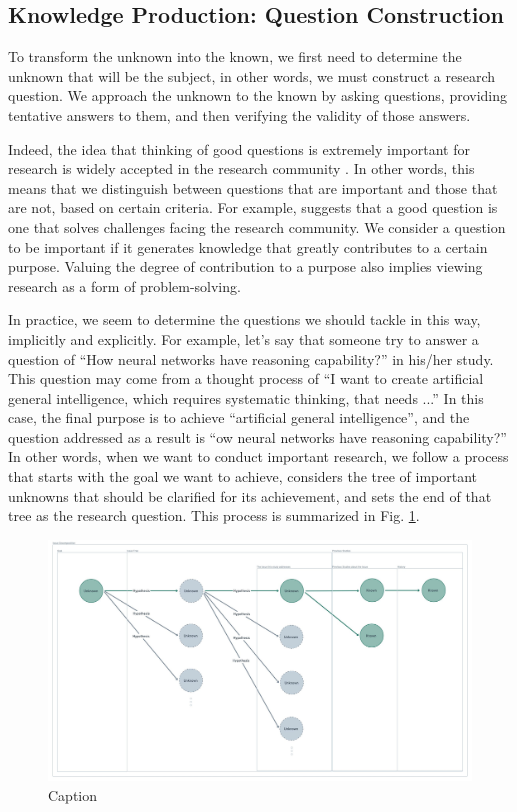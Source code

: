 \documentclass{book}
\begin{document}
\subsection{Knowledge Production: Question Construction}
To transform the unknown into the known, we first need to determine the unknown that will be the subject, in other words, we must construct a research question. We approach the unknown to the known by asking questions, providing tentative answers to them, and then verifying the validity of those answers. 

Indeed, the idea that thinking of good questions is extremely important for research is widely accepted in the research community \cite{alon2009choose}. In other words, this means that we distinguish between questions that are important and those that are not, based on certain criteria. For example, \cite{alon2009choose} suggests that a good question is one that solves challenges facing the research community. We consider a question to be important if it generates knowledge that greatly contributes to a certain purpose. Valuing the degree of contribution to a purpose also implies viewing research as a form of problem-solving.

In practice, we seem to determine the questions we should tackle in this way, implicitly and explicitly. For example, let's say that someone try to answer a question of ``How neural networks have reasoning capability?'' in his/her study. This question may come from a thought process of ``I want to create artificial general intelligence, which requires systematic thinking, that needs ...'' In this case, the final purpose is to achieve ``artificial general intelligence'', and the question addressed as a result is ``ow neural networks have reasoning capability?'' In other words, when we want to conduct important research, we follow a process that starts with the goal we want to achieve, considers the tree of important unknowns that should be clarified for its achievement, and sets the end of that tree as the research question. This process is summarized in Fig. \ref{fig:unknown_tree}.

\begin{figure}[htb]
    \centering
    \includegraphics[width=\textwidth]{figs/unknown_tree.jpeg}
    \caption{Caption}
    \label{fig:unknown_tree}
\end{figure}
\end{document}
